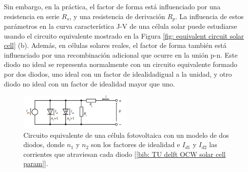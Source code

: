 \documentclass[12pt]{article}
\begin{document}
	\noindent Sin embargo, en la práctica, el factor de forma está influenciado por una resistencia en serie $R_{s}$, y una resistencia de derivación $R_{p}$. La influencia de estos parámetros en la curva característica J-V de una célula solar puede estudiarse usando el circuito equivalente mostrado en la Figura \ref{fig: equivalent circuit solar cell} (b). Además, en células solares reales, el factor de forma también está influenciado por una recombinación adicional que ocurre en la unión p-n. Este diodo no ideal se representa normalmente con un circuito equivalente formado por dos diodos, uno ideal con un factor de idealidad\footnotemark \enspace igual a la unidad, y otro diodo no ideal con un factor de idealidad mayor que uno. \\
	

	
	\begin{figure}[h]
		\begin{center}
			\includegraphics[width=0.5\textwidth]{img/nonIdeal_equivCircuit_solarCell.png}
			\caption{Circuito equivalente de una célula fotovoltaica con un modelo de dos diodos, donde $n_{1}$ y $n_{2}$ son los factores de idealidad e $I_{d1}$ y $I_{d2}$ las corrientes que atraviesan cada diodo [\ref{bib: TU delft OCW solar cell param}].}
			\label{fig: non-Ideal equivalent circuit solar cell}
		\end{center}
	\end{figure}	
	
	
	
\end{document}
